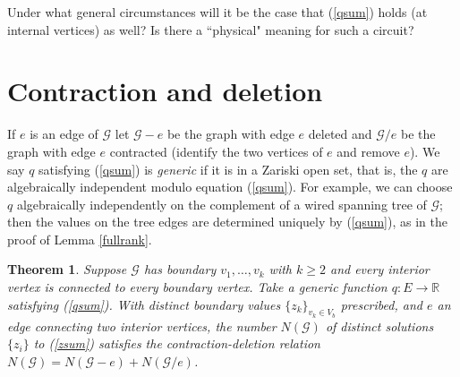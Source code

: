 \documentclass[12pt]{amsart}
\newtheorem{theorem}{Theorem}
\newcommand{\G}{{\mathcal G}}
\begin{document}
 Under what general circumstances will it be the case that (\ref{qsum}) holds (at internal vertices) as well? Is there a ``physical" meaning for such a circuit?


\section{Contraction and deletion}\label{Tuttepolysection}

If $e$ is an edge of $\G$ let $\G-e$ be the graph with edge $e$ deleted and $\G/e$ be the graph with edge $e$ contracted
(identify the two vertices of $e$ and remove $e$). 
We say $q$ satisfying (\ref{qsum}) is \emph{generic} if it is in a Zariski open set, that is, the $q$ are algebraically independent modulo equation
(\ref{qsum}). For example, we can choose $q$ algebraically independently on the complement of a wired spanning tree of $\G$; then the values on the tree
edges are determined uniquely by (\ref{qsum}), as in the proof of Lemma \ref{fullrank}. 

\begin{theorem}\label{contractdelete}
Suppose $\G$ has boundary $v_1,\dots,v_k$ with $k\ge 2$ and every interior vertex is connected to every boundary vertex.
Take a generic function $q:E \to \mathbb{R}$ satisfying (\ref{qsum}).
With distinct boundary values $\{z_k\}_{v_k\in V_b}$ prescribed, and $e$ an edge connecting two interior vertices,
the number $N(\G)$ of distinct solutions $\{z_i\}$ to 
(\ref{zsum}) satisfies the contraction-deletion relation $N(\G) = N(\G-e) + N(\G/e)$.
\end{theorem}
\end{document}
